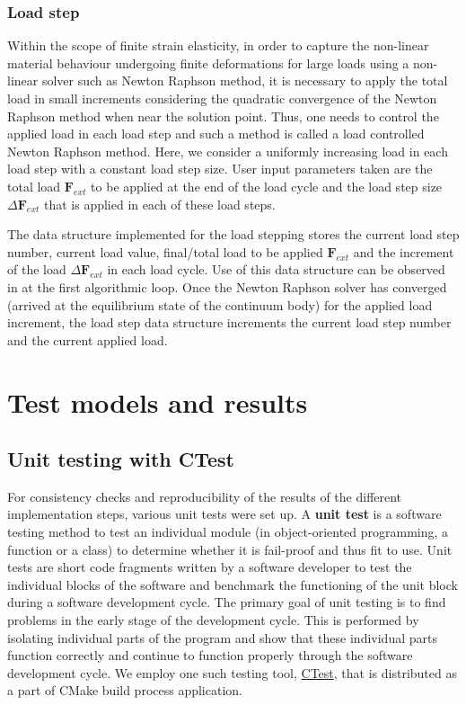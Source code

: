 \subsubsection{Load step}
Within the scope of finite strain elasticity, in order to capture the non-linear material behaviour undergoing finite deformations for large loads using a non-linear solver such as Newton Raphson method, it is necessary to apply the total load in small increments considering the quadratic convergence of the Newton Raphson method when near the solution point. Thus, one needs to control the applied load in each load step and such a method is called a load controlled Newton Raphson method. Here, we consider a uniformly increasing load in each load step with a constant load step size. User input parameters taken are the total load $\mathbf{F}_{ext}$ to be applied at the end of the load cycle and the load step size $\Delta \mathbf{F}_{ext}$ that is applied in each of these load steps. \par 
The data structure implemented for the load stepping stores the current load step number, current load value, final/total load to be applied $\mathbf{F}_{ext}$ and the increment of the load $\Delta \mathbf{F}_{ext}$ in each load cycle. Use of this data structure can be observed in  at the first algorithmic loop. Once the Newton Raphson solver has converged (arrived at the equilibrium state of the continuum body) for the applied load increment, the load step data structure increments the current load step number and the current applied load.
 
\section{Test models and results}

\subsection{Unit testing with CTest}
For consistency checks and reproducibility of the results of the different implementation steps, various unit tests were set up. A \textbf{unit test} is a software testing method to test an individual module (in object-oriented programming, a function or a class) to determine whether it is fail-proof and thus fit to use. Unit tests are short code fragments written by a software developer to test the individual blocks of the software and benchmark the functioning of the unit block during a software development cycle. The primary goal of unit testing is to find problems in the early stage of the development cycle. This is performed by isolating individual parts of the program and show that these individual parts function correctly and continue to function properly through the software development cycle. We employ one such testing tool, \href{https://gitlab.kitware.com/cmake/community/wikis/doc/ctest/Testing-With-CTest}{CTest}, that is distributed as a part of CMake build process application. \par 

